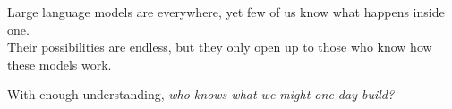 \documentclass[../main.tex]{subfiles}
\begin{document}

Large language models are everywhere, yet few of us know what happens inside one. \\
Their possibilities are endless, but they only open up to those who know how these models work.

With enough understanding, \textit{who knows what we might one day build?}
\end{document}
